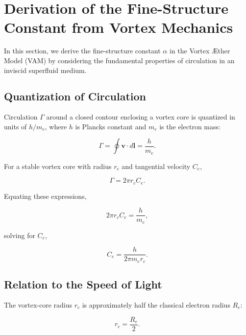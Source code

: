 

\section{Derivation of the Fine-Structure Constant from Vortex Mechanics}
\label{sec:appendix-alpha}

In this section, we derive the fine-structure constant $\alpha$ in the Vortex Æther Model (VAM) by considering the fundamental properties of circulation in an inviscid superfluid medium.

\subsection{Quantization of Circulation}

Circulation $\Gamma$ around a closed contour enclosing a vortex core is quantized in units of $h/m_e$, where $h$ is Planck\rqs s constant and $m_e$ is the electron mass:

\begin{equation}
    \Gamma = \oint \mathbf{v} \cdot d\mathbf{l} = \frac{h}{m_e}.
\end{equation}

For a stable vortex core with radius $r_c$ and tangential velocity $C_e$,

\begin{equation}
    \Gamma = 2 \pi r_c C_e.
\end{equation}

Equating these expressions,

\begin{equation}
    2 \pi r_c C_e = \frac{h}{m_e},
\end{equation}

solving for $C_e$,

\begin{equation}
    C_e = \frac{h}{2 \pi m_e r_c}.
\end{equation}

\subsection{Relation to the Speed of Light}

The vortex-core radius $r_c$ is approximately half the classical electron radius $R_e$:

\begin{equation}
    r_c = \frac{R_e}{2}.
\end{equation}

